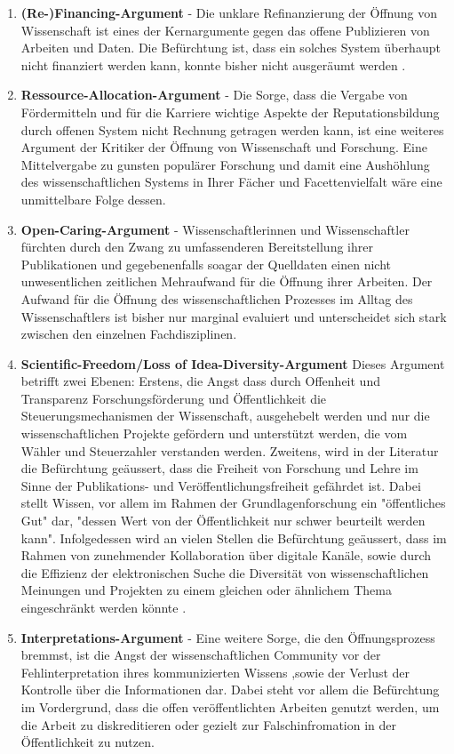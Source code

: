 \begin{enumerate}
\item \textbf{(Re-)Financing-Argument} - Die unklare Refinanzierung der Öffnung von Wissenschaft ist eines der Kernargumente gegen das offene Publizieren von Arbeiten und Daten. Die Befürchtung ist, dass ein solches System überhaupt nicht finanziert werden kann, konnte bisher nicht ausgeräumt werden \cite{weishaupt_2009_goldenOA}.
\item \textbf{Ressource-Allocation-Argument} - Die Sorge, dass die Vergabe von Fördermitteln und für die Karriere wichtige Aspekte der Reputationsbildung durch offenen System nicht Rechnung getragen werden kann, ist eine weiteres Argument der Kritiker der Öffnung von Wissenschaft und Forschung. Eine Mittelvergabe zu gunsten populärer Forschung und damit eine Aushöhlung des wissenschaftlichen Systems in Ihrer Fächer und Facettenvielfalt wäre eine unmittelbare Folge dessen.
\item \textbf{Open-Caring-Argument} - Wissenschaftlerinnen und Wissenschaftler fürchten durch den Zwang zu umfassenderen Bereitstellung ihrer Publikationen und gegebenenfalls soagar der Quelldaten einen nicht unwesentlichen zeitlichen Mehraufwand für die Öffnung ihrer Arbeiten. Der Aufwand für die Öffnung des wissenschaftlichen Prozesses im Alltag des Wissenschaftlers ist bisher nur marginal evaluiert \cite{osterloh2008anreize} und unterscheidet sich stark zwischen den einzelnen Fachdisziplinen.
\item \textbf{Scientific-Freedom/Loss of Idea-Diversity-Argument}
Dieses Argument betrifft zwei Ebenen: Erstens, die Angst dass durch Offenheit und Transparenz Forschungsförderung und Öffentlichkeit die Steuerungsmechanismen der Wissenschaft, ausgehebelt werden und nur die wissenschaftlichen Projekte gefördern und unterstützt werden, die vom Wähler und Steuerzahler verstanden werden. Zweitens, wird in der Literatur die Befürchtung geäussert, dass die Freiheit von Forschung und Lehre im Sinne der Publikations- und Veröffentlichungsfreiheit gefährdet ist\cite{Jochum_2009}. Dabei stellt Wissen, vor allem im Rahmen der Grundlagenforschung ein "öffentliches Gut" dar, "dessen Wert von der Öffentlichkeit nur schwer beurteilt werden kann"\cite{osterloh2008anreize}. Infolgedessen wird an vielen Stellen die Befürchtung geäussert, dass im Rahmen von zunehmender Kollaboration über digitale Kanäle, sowie durch die Effizienz der elektronischen Suche die Diversität von wissenschaftlichen Meinungen und Projekten zu einem gleichen oder ähnlichem Thema eingeschränkt werden könnte \cite{Evans_2008}.
\item \textbf{Interpretations-Argument} - Eine weitere Sorge, die den Öffnungsprozess bremmst, ist die Angst der wissenschaftlichen Community vor der Fehlinterpretation ihres kommunizierten Wissens ,sowie der Verlust der Kontrolle über die Informationen\cite{gibbons_1994} dar. Dabei steht vor allem die Befürchtung im Vordergrund, dass die offen veröffentlichten Arbeiten genutzt werden, um die Arbeit zu diskreditieren oder gezielt zur Falschinfromation in der Öffentlichkeit zu nutzen.

\end{enumerate}
